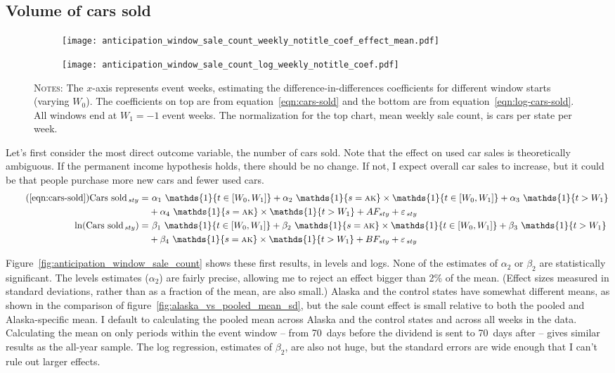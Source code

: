 \documentclass[11pt,letterpaper,oneside]{article}
\let\originalleft\left
\let\originalright\right
\renewcommand{\left}{\mathopen{}\mathclose\bgroup\originalleft}
\renewcommand{\right}{\aftergroup\egroup\originalright}
\newcommand{\snippet}[1]{\hspace{-0.15em}}
\newcommand{\indicator}[1]{\mathds{1}\left\{#1\right\}}
\newcommand{\anticipation}{\indicator{t \in [W_0, W_1]}}
\newcommand{\isAlaska}{\indicator{s = \textsc{ak}}}
\newcommand{\postWindow}{\indicator{t > W_1}}
\newcommand{\ddEqn}[3]{%
\text{#1}_{\, sty} = & \  #2_1 \ \anticipation + #2_2 \ \isAlaska \times \anticipation + #2_3 \ \postWindow \\ \nonumber
&+ #2_4 \ \isAlaska \times \postWindow + #3 F_{ sty} + \varepsilon_{\, sty}
}
\newcommand{\ddEqnLog}[3]{%
\ln\left(\text{#1}_{\, sty}\right) = & \  #2_1 \ \anticipation + #2_2 \ \isAlaska \times \anticipation + #2_3 \ \postWindow \\ \nonumber
&+ #2_4 \ \isAlaska \times \postWindow + #3 F_{ sty} + \varepsilon_{\, sty}
}
\begin{document}
\begin{doublespacing}
\subsection{Volume of cars sold}


\begin{figure}[!hbtp]
    \caption{$\alpha_2$ and $\beta_2$, the treatment coefficients on Alaska $\times$ anticipation, for varying windows}
    \label{fig:anticipation_window_sale_count}
    \begin{subfigure}{\linewidth}
    \texttt{[image: anticipation\_window\_sale\_count\_weekly\_notitle\_coef\_effect\_mean.pdf]}
    \end{subfigure}
    \begin{subfigure}{\linewidth}
    \texttt{[image: anticipation\_window\_sale\_count\_log\_weekly\_notitle\_coef.pdf]}
    \end{subfigure}

    {\footnotesize
    \textsc{Notes:}
    The $x$-axis represents event weeks, estimating the difference\hyp{}in\hyp{}differences coefficients for different window starts (varying $W_0$).
    The coefficients on top are from equation~\ref{eqn:cars-sold} and the bottom are from equation~\ref{eqn:log-cars-sold}.
    All windows end at $W_1 = -1$ event weeks.
    The normalization for the top chart, mean weekly sale count, is \snippet{sales_count_weekly_mean.tex} cars per state per week.
    }
\end{figure}


Let's first consider the most direct outcome variable, the number of cars sold.
Note that the effect on used car sales is theoretically ambiguous.
If the permanent income hypothesis holds, there should be no change.
If not, I expect overall car sales to increase, but it could be that people purchase more new cars and fewer used cars.
\begin{align}
    \tag{\ref{eqn:cars-sold}}
    \ddEqn{Cars sold}{\alpha}{A}\\
    \label{eqn:log-cars-sold}
    \ddEqnLog{Cars sold}{\beta}{B}
\end{align}

Figure~\ref{fig:anticipation_window_sale_count} shows these first results, in levels and logs.
None of the estimates of $\alpha_2$ or $\beta_2$ are statistically significant.
The levels estimates ($\alpha_2$) are fairly precise, allowing me to reject an effect bigger than 2\% of the mean.
(Effect sizes measured in standard deviations, rather than as a fraction of the mean, are also small.)
Alaska and the control states have somewhat different means, as shown in the comparison of figure~\ref{fig:alaska_vs_pooled_mean_sd}, but the sale count effect is small relative to both the pooled and Alaska\hyp{}specific mean.
I default to calculating the pooled mean across Alaska and the control states and across all weeks in the data.
Calculating the mean on only periods within the event window -- from 70~days before the dividend is sent to 70~days after -- gives similar results as the all\hyp{}year sample.
The log regression, estimates of $\beta_2$, are also not huge, but the standard errors are wide enough that I can't rule out larger effects.


\end{doublespacing}
\end{document}
